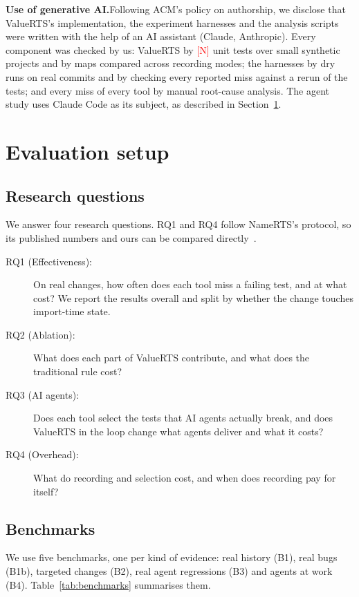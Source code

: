 \documentclass[acmsmall,screen,review,anonymous]{acmart}
\newcommand{\ph}[1]{\textcolor{red}{[#1]}}
\newcommand{\tool}{ValueRTS\xspace}
\newcommand{\para}[1]{\smallskip\noindent\textbf{#1}\hspace{0.4em}}
\begin{document}
\para{Use of generative AI.}Following ACM's policy on authorship, we disclose that \tool's implementation, the experiment harnesses and the analysis scripts were written with the help of an AI assistant (Claude, Anthropic). Every component was checked by us: \tool by \ph{N} unit tests over small synthetic projects and by maps compared across recording modes; the harnesses by dry runs on real commits and by checking every reported miss against a rerun of the tests; and every miss of every tool by manual root-cause analysis. The agent study uses Claude Code as its subject, as described in Section~\ref{sec:evaluation-setup}.


\section{Evaluation setup}\label{sec:evaluation-setup}

\subsection{Research questions}
We answer four research questions. RQ1 and RQ4 follow NameRTS's protocol, so its published numbers and ours can be compared directly~\cite{wang2026namerts}.

\begin{description}
  \item[RQ1 (Effectiveness):] On real changes, how often does each tool miss a failing test, and at what cost? We report the results overall and split by whether the change touches import-time state.
  \item[RQ2 (Ablation):] What does each part of \tool contribute, and what does the traditional rule cost?
  \item[RQ3 (AI agents):] Does each tool select the tests that AI agents actually break, and does \tool in the loop change what agents deliver and what it costs?
  \item[RQ4 (Overhead):] What do recording and selection cost, and when does recording pay for itself?
\end{description}


\subsection{Benchmarks}
We use five benchmarks, one per kind of evidence: real history (B1), real bugs (B1b), targeted changes (B2), real agent regressions (B3) and agents at work (B4). Table~\ref{tab:benchmarks} summarises them.
\end{document}
